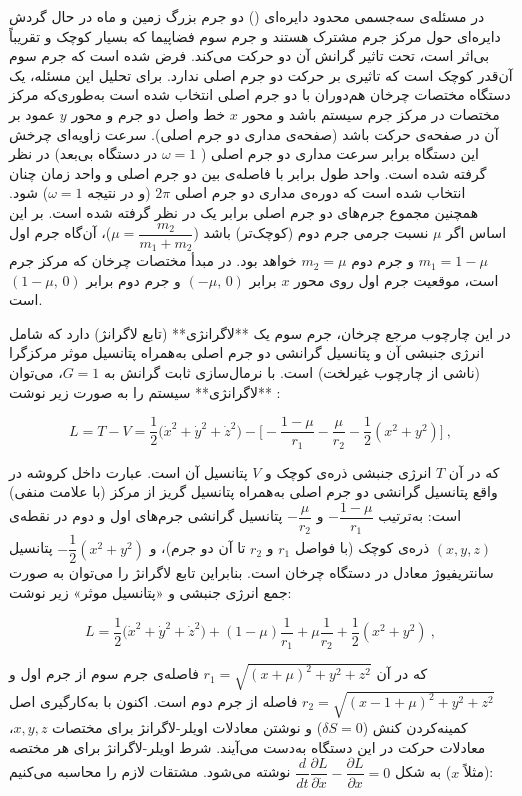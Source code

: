 در مسئله‌ی سه‌جسمی محدود دایره‌ای () دو جرم بزرگ زمین و ماه در حال گردش دایره‌ای حول مرکز جرم مشترک هستند و جرم سوم فضاپیما که بسیار کوچک و تقریباً بی‌اثر است، تحت تاثیر گرانش آن دو حرکت می‌کند. فرض شده است که جرم سوم آن‌قدر کوچک است که تاثیری بر حرکت دو جرم اصلی ندارد. برای تحلیل این مسئله، یک دستگاه مختصات چرخان هم‌دوران با دو جرم اصلی انتخاب شده است به‌طوری‌که مرکز مختصات در مرکز جرم سیستم باشد و محور $x$ خط واصل دو جرم و محور $y$ عمود بر آن در صفحه‌ی حرکت باشد (صفحه‌ی مداری دو جرم اصلی). سرعت زاویه‌ای چرخش این دستگاه برابر سرعت مداری دو جرم اصلی ( $\omega=1$ در دستگاه بی‌بعد) در نظر گرفته شده است. واحد طول برابر با فاصله‌ی بین دو جرم اصلی و واحد زمان چنان انتخاب شده است که دوره‌ی مداری دو جرم اصلی $2\pi$ (و در نتیجه $\omega=1$) شود. همچنین مجموع جرم‌های دو جرم اصلی برابر یک در نظر گرفته شده است. بر این اساس اگر $\mu$ نسبت جرمی جرم دوم (کوچک‌تر) باشد ($\mu=\dfrac{m_2}{m_1+m_2}$)، آن‌گاه جرم اول $m_1=1-\mu$ و جرم دوم $m_2=\mu$ خواهد بود. در مبدأ مختصات چرخان که مرکز جرم است، موقعیت جرم اول روی محور $x$ برابر $(-\mu,\,0)$ و جرم دوم برابر $(1-\mu,\,0)$ است.  

در این چارچوب مرجع چرخان، جرم سوم یک **لاگرانژی** (تابع لاگرانژ) دارد که شامل انرژی جنبشی آن و پتانسیل گرانشی دو جرم اصلی به‌همراه پتانسیل موثر مرکزگرا (ناشی از چارچوب غیرلخت) است. با نرمال‌سازی ثابت گرانش به $G=1$، می‌توان **لاگرانژی** سیستم را به صورت زیر نوشت
\cite{vallado2001fundamentals}:

$$ 
L = T - V = \dfrac{1}{2}\Big(\dot{x}^2+\dot{y}^2+\dot{z}^2\Big)-\Bigg[-\dfrac{1-\mu}{r_1}-\dfrac{\mu}{r_2}-\dfrac{1}{2}(x^2+y^2)\Bigg]~, 
$$

که در آن $T$ انرژی جنبشی ذره‌ی کوچک و $V$ پتانسیل آن است. عبارت داخل کروشه در واقع پتانسیل گرانشی دو جرم اصلی به‌همراه پتانسیل گریز از مرکز (با علامت منفی) است: به‌ترتیب $-\dfrac{1-\mu}{r_1}$ و $-\dfrac{\mu}{r_2}$ پتانسیل گرانشی جرم‌های اول و دوم در نقطه‌ی $(x,y,z)$ ذره‌ی کوچک (با فواصل $r_1$ و $r_2$ تا آن دو جرم)، و $-\dfrac{1}{2}(x^2+y^2)$ پتانسیل سانتریفیوژ معادل در دستگاه چرخان است. بنابراین تابع لاگرانژ را می‌توان به صورت جمع انرژی جنبشی و «پتانسیل موثر» زیر نوشت:

$$
L = \dfrac{1}{2}\Big(\dot{x}^2+\dot{y}^2+\dot{z}^2\Big)+(1-\mu)\dfrac{1}{r_1}+\mu\dfrac{1}{r_2}+\dfrac{1}{2}(x^2+y^2)~,
$$

که در آن $r_1=\sqrt{(x+\mu)^2+y^2+z^2}$ فاصله‌ی جرم سوم از جرم اول و $r_2=\sqrt{(x-1+\mu)^2+y^2+z^2}$ فاصله از جرم دوم است. اکنون با به‌کارگیری اصل کمینه‌کردن کنش ($\delta S=0$) و نوشتن معادلات اویلر-لاگرانژ برای مختصات $x, y, z$، معادلات حرکت در این دستگاه به‌دست می‌آیند. شرط اویلر-لاگرانژ برای هر مختصه (مثلاً $x$) به شکل $\dfrac{d}{dt}\dfrac{\partial L}{\partial \dot{x}} - \dfrac{\partial L}{\partial x}=0$ نوشته می‌شود. مشتقات لازم را محاسبه می‌کنیم:

